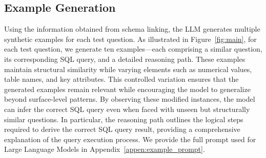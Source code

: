 \subsection{Example Generation}

Using the information obtained from schema linking, the LLM generates multiple synthetic examples for each test question. As illustrated in Figure~\ref{fig:main}, for each test question, we generate ten examples—each comprising a similar question, its corresponding SQL query, and a detailed reasoning path. These examples maintain structural similarity while varying elements such as numerical values, table names, and key attributes. This controlled variation ensures that the generated examples remain relevant while encouraging the model to generalize beyond surface-level patterns. By observing these modified instances, the model can infer the correct SQL query even when faced with unseen but structurally similar questions. In particular, the reasoning path outlines the logical steps required to derive the correct SQL query result, providing a comprehensive explanation of the query execution process. We provide the full prompt used for Large Language Models in Appendix~\ref{appen:example_prompt}.

